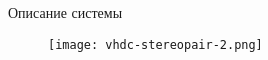 \begin{frame}{Описание системы}
\begin{figure}
    \centering
    \texttt{[image: vhdc-stereopair-2.png]}
\end{figure}
\end{frame}